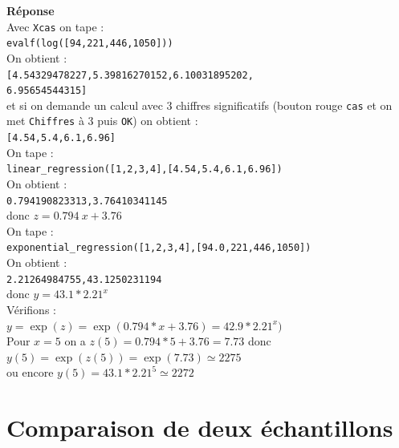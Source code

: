 \documentclass[a4paper,11pt]{book}
\begin{document}
\begin{itemize}
{\bf R\'eponse}\\
Avec {\tt Xcas} on tape :\\
{\tt evalf(log([94,221,446,1050]))} \\
On obtient :\\
{\tt [4.54329478227,5.39816270152,6.10031895202,\\6.95654544315]} \\
et si on demande un calcul avec 3 chiffres significatifs (bouton rouge 
{\tt cas} et on met {\tt Chiffres} \`a 3 puis {\tt OK}) on obtient :\\
{\tt [4.54,5.4,6.1,6.96]}\\
On tape :\\
{\tt linear\_regression([1,2,3,4],[4.54,5.4,6.1,6.96])}\\
On obtient :\\
{\tt 0.794190823313,3.76410341145}\\
donc $z=0.794\ x+3.76$\\
On tape :\\
{\tt exponential\_regression([1,2,3,4],[94.0,221,446,1050])}\\
On obtient :\\
{\tt 2.21264984755,43.1250231194}\\
donc $y=43.1*2.21^x$\\
V\'erifions :\\
$y=\exp(z)=\exp(0.794*x+3.76)=42.9*2.21^x)$\\
Pour $x=5$ on a $z(5)=0.794*5+3.76=7.73$ donc \\
$y(5)=\exp(z(5))=\exp(7.73)\simeq 2275$\\
ou encore $y(5)=43.1*2.21^5\simeq 2272$
\end{itemize}
\section{Comparaison de deux \'echantillons}
\end{document}
